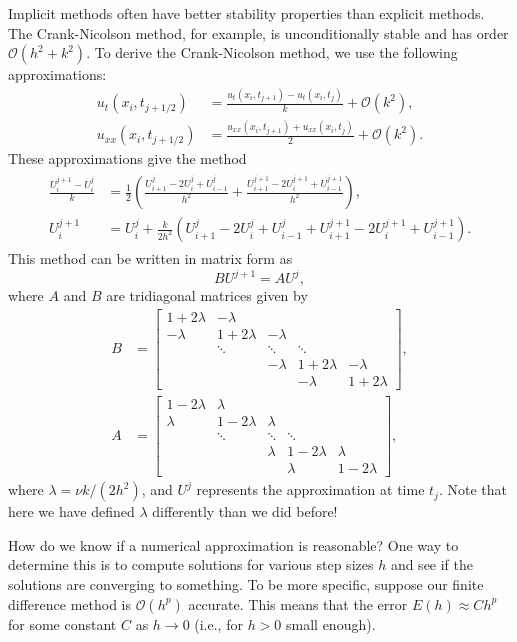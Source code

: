 Implicit methods often have better stability properties than explicit methods.
The Crank-Nicolson method, for example, is unconditionally stable and has order $\mathcal{O}(h^2 + k^2)$.
To derive the Crank-Nicolson method, we use the following approximations:
\begin{align*}
	u_t(x_i,t_{j+1/2}) &= \frac{u_t(x_i,t_{j+1}) - u_t(x_i,t_j)}{k} + \mathcal{O}(k^2), \\
	u_{xx}(x_i,t_{j+1/2}) &= \frac{u_{xx}(x_i,t_{j+1}) + u_{xx}(x_i,t_j)}{2} + \mathcal{O}(k^2).
\end{align*}
These approximations give the method
\begin{align}
	\begin{split}
	\frac{U^{j+1}_i - U^j_i}{k} &= \frac{1}{2}\left( \frac{U^j_{i+1} - 2U^j_{i} + U^j_{i-1}}{h^2} + \frac{U^{j+1}_{i+1} - 2U^{j+1}_{i} + U^{j+1}_{i-1}}{h^2}  \right) ,\\
	U^{j+1}_i  &= U^j_i + \frac{k}{2h^2} \left( U^j_{i+1} - 2U^j_{i} + U^j_{i-1} + U^{j+1}_{i+1} - 2U^{j+1}_{i} + U^{j+1}_{i-1}   \right).
\end{split}
\end{align}
This method can be written in matrix form as
\[BU^{j+1} = A U^j,\]
where $A$ and $B$ are tridiagonal matrices given by
\begin{align*}
B &= \left[\begin{array}{cccccc}1+2\lambda & -\lambda &  &  &  \\ -\lambda & 1+2\lambda &  -\lambda & &  \\ &  \ddots &   \ddots & \ddots \\ & &  -\lambda &  1+2\lambda & -\lambda \\ &  &  & -\lambda & 1+2\lambda\end{array}\right], \\
A &= \left[\begin{array}{cccccc}1-2\lambda & \lambda &  &  &  \\ \lambda & 1-2\lambda &  \lambda & &  \\ &  \ddots &   \ddots & \ddots \\ & &  \lambda &  1-2\lambda & \lambda \\ &  &  & \lambda & 1-2\lambda\end{array}\right],
\end{align*}
where $\lambda = \nu k/(2h^2)$, and $U^j$ represents the approximation at time $t_j$.
Note that here we have defined $\lambda$ differently than we did before!

How do we know if a numerical approximation is reasonable?
One way to determine this is to compute solutions for various step sizes $h$ and see if the solutions are converging to something.
To be more specific, suppose our finite difference method is $\mathcal{O}(h^p)$ accurate.
This means that the error $E(h) \approx Ch^p$ for some constant $C$ as $h \to 0$ (i.e., for $h>0$ small enough).

